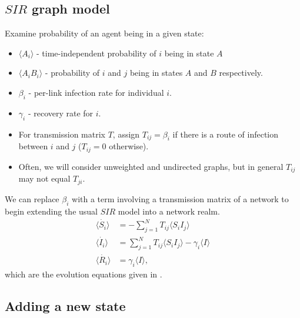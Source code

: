 \documentclass[unknownkeysallowed]{beamer}
\begin{document}
\subsection{$SIR$ graph model} 
\begin{frame}

Examine probability of an agent being in a given state: 
\begin{itemize}
	\pause
	\item $\langle A_i \rangle$ - time-independent probability of $i$ being in state $A$
	\pause
	\item $\langle A_i B_i \rangle$ - probability of $i$ and $j$ being in states $A$ and $B$ respectively.
	\pause
	\item $\beta_i$ - per-link infection rate for individual $i$.
	\pause
	\item $\gamma_i$ - recovery rate for $i$. 
	\pause
	\item For transmission matrix $T$, assign $T_{ij}=\beta_i$ if there is a route of infection between $i$ and $j$ ($T_{ij}=0$ otherwise). 
	\pause
	\item Often, we will consider unweighted and undirected graphs, but in general $T_{ij}$ may not equal $T_{ji}$.
\end{itemize}

\end{frame}


\begin{frame}

We can replace $\beta_i$ with a term involving a transmission matrix of a network to begin extending the usual $SIR$ model into a network realm. 
\begin{align*}
\dot{\langle S_i \rangle} & = -\sum^{N}_{j=1}T_{ij} \langle S_i I_j \rangle\\
\dot{\langle I_i \rangle} & =\sum^{N}_{j=1}T_{ij}\langle S_i I_j \rangle - \gamma_i \langle I \rangle \\
\dot{\langle R_i \rangle} & = \gamma_i \langle I \rangle,
\end{align*}
which are the evolution equations given in \cite{kiss_2014}.

\end{frame}


\subsection{Adding a new state}
\end{document}
